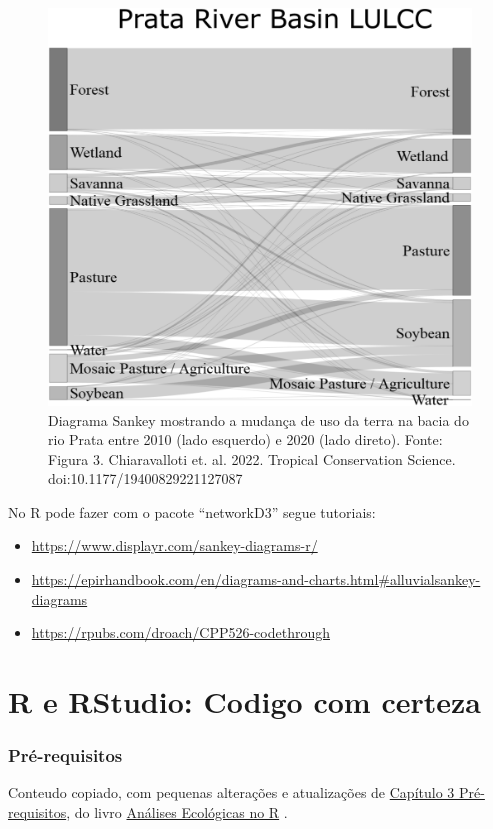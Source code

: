 \documentclass[
]{article}
\begin{document}
\begin{figure}

{\centering \includegraphics[width=0.5\linewidth,height=0.5\textheight]{figures/images_large_10.1177_19400829221127087-fig3} 

}

\caption{Diagrama Sankey mostrando a mudança de uso da terra na bacia do rio Prata entre 2010 (lado esquerdo) e 2020 (lado direto). Fonte: Figura 3. Chiaravalloti et. al. 2022. Tropical Conservation Science. doi:10.1177/19400829221127087}\label{fig:plot-fig-sankey}
\end{figure}

No R pode fazer com o pacote ``networkD3'' segue tutoriais:

\begin{itemize}
\item
  \url{https://www.displayr.com/sankey-diagrams-r/}
\item
  \url{https://epirhandbook.com/en/diagrams-and-charts.html\#alluvialsankey-diagrams}
\item
  \url{https://rpubs.com/droach/CPP526-codethrough}
\end{itemize}

\newpage

\hypertarget{part-r-e-rstudio-codigo-com-certeza}{%
\part{R e RStudio: Codigo com certeza}\label{part-r-e-rstudio-codigo-com-certeza}}

\newpage{}

\hypertarget{cap20}{%
\section{Pré-requisitos}\label{cap20}}

Conteudo copiado, com pequenas alterações e atualizações de \href{https://analises-ecologicas.com/cap3}{Capítulo 3 Pré-requisitos}, do livro \href{https://analises-ecologicas.com/}{Análises Ecológicas no R} .
\end{document}
